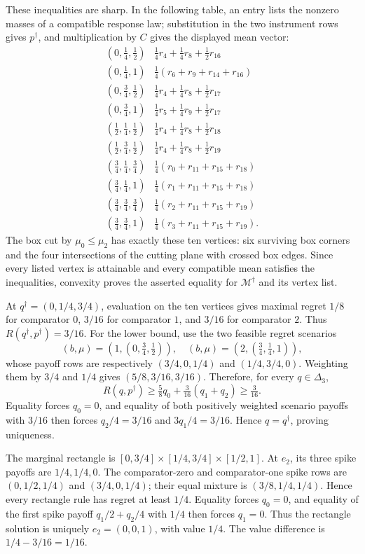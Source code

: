 These inequalities are sharp.  In the following table, an entry lists the nonzero masses of a compatible response law; substitution in the two instrument rows gives \(p^\dagger\), and multiplication by \(C\) gives the displayed mean vector:
\[
\begin{array}{c|l}
(0,\tfrac14,\tfrac12)&\tfrac14r_4+\tfrac14r_8+\tfrac12r_{16}\\
(0,\tfrac14,1)&\tfrac14(r_6+r_9+r_{14}+r_{16})\\
(0,\tfrac34,\tfrac12)&\tfrac14r_4+\tfrac14r_8+\tfrac12r_{17}\\
(0,\tfrac34,1)&\tfrac14r_5+\tfrac14r_9+\tfrac12r_{17}\\
(\tfrac12,\tfrac14,\tfrac12)&\tfrac14r_4+\tfrac14r_8+\tfrac12r_{18}\\
(\tfrac12,\tfrac34,\tfrac12)&\tfrac14r_4+\tfrac14r_8+\tfrac12r_{19}\\
(\tfrac34,\tfrac14,\tfrac34)&\tfrac14(r_0+r_{11}+r_{15}+r_{18})\\
(\tfrac34,\tfrac14,1)&\tfrac14(r_1+r_{11}+r_{15}+r_{18})\\
(\tfrac34,\tfrac34,\tfrac34)&\tfrac14(r_2+r_{11}+r_{15}+r_{19})\\
(\tfrac34,\tfrac34,1)&\tfrac14(r_3+r_{11}+r_{15}+r_{19}).
\end{array}
\]
The box cut by \(\mu_0\leq\mu_2\) has exactly these ten vertices: six surviving box corners and the four intersections of the cutting plane with crossed box edges.  Since every listed vertex is attainable and every compatible mean satisfies the inequalities, convexity proves the asserted equality for \(\mathcal M^\dagger\) and its vertex list.

At \(q^\dagger=(0,1/4,3/4)\), evaluation on the ten vertices gives maximal regret \(1/8\) for comparator \(0\), \(3/16\) for comparator \(1\), and \(3/16\) for comparator \(2\).  Thus \(R(q^\dagger,p^\dagger)=3/16\).  For the lower bound, use the two feasible regret scenarios
\[
 (b,\mu)=\left(1,(0,\tfrac34,\tfrac12)\right),\quad
 (b,\mu)=\left(2,(\tfrac34,\tfrac14,1)\right),
\]
whose payoff rows are respectively \((3/4,0,1/4)\) and \((1/4,3/4,0)\).  Weighting them by \(3/4\) and \(1/4\) gives \((5/8,3/16,3/16)\).  Therefore, for every \(q\in\Delta_3\),
\[
 R(q,p^\dagger)\geq\tfrac58q_0+\tfrac3{16}(q_1+q_2)\geq\tfrac3{16}.
\]
Equality forces \(q_0=0\), and equality of both positively weighted scenario payoffs with \(3/16\) then forces \(q_2/4=3/16\) and \(3q_1/4=3/16\).  Hence \(q=q^\dagger\), proving uniqueness.

The marginal rectangle is \([0,3/4]\times[1/4,3/4]\times[1/2,1]\).  At \(e_2\), its three spike payoffs are \(1/4,1/4,0\).  The comparator-zero and comparator-one spike rows are \((0,1/2,1/4)\) and \((3/4,0,1/4)\); their equal mixture is \((3/8,1/4,1/4)\).  Hence every rectangle rule has regret at least \(1/4\).  Equality forces \(q_0=0\), and equality of the first spike payoff \(q_1/2+q_2/4\) with \(1/4\) then forces \(q_1=0\).  Thus the rectangle solution is uniquely \(e_2=(0,0,1)\), with value \(1/4\).  The value difference is \(1/4-3/16=1/16\).

